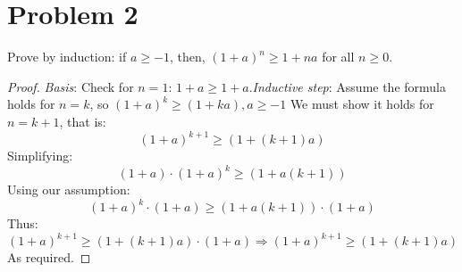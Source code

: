 \documentclass[12pt]{article}
\title{\scalebox{2}{Math 341 Exam 1}}
\author{\scalebox{1.5}{Theo Koss}}
\date{September 2020}
\begin{document}
\maketitle
\section{Problem 2}
Prove by induction: if $a\geq-1$, then, $(1+a)^n\geq1+na$ for all $n\geq0$.
\begin{proof}
\emph{Basis}: Check for $n=1$: $1+a\geq1+a$.\newline \emph{Inductive step}: \newline Assume the formula holds for $n=k$, so $(1+a)^k\geq(1+ka), a\geq-1$ We must show it holds for $n=k+1$, that is: $$(1+a)^{k+1}\geq(1+(k+1)a)$$ Simplifying:$$(1+a)\cdot(1+a)^k\geq(1+a(k+1))$$ Using our assumption:$$(1+a)^k\cdot(1+a)\geq(1+a(k+1))\cdot(1+a)$$ Thus:$$(1+a)^{k+1}\geq(1+(k+1)a)\cdot(1+a)\Longrightarrow(1+a)^{k+1}\geq(1+(k+1)a)$$ As required.
\end{proof}
\end{document}
